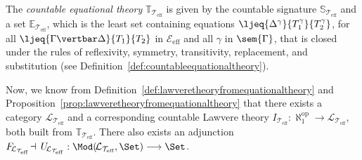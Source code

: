 \begin{definition}
\label{def:countableeqthfromeffth}
The \emph{countable equational theory} $\mathbb{T}_{\!\mathcal{T}_{\text{eff}}}$ is given by the countable signature $\mathbb{S}_{\mathcal{T}_{\text{eff}}}$ and a set $\mathbb{E}_{\!\mathcal{T}_{\text{eff}}}$, which is the least set containing equations $\ljeq {\Delta^\gamma} {T^\gamma_1} {T^\gamma_2}$, for all  $\ljeq {\Gamma \vertbar \Delta} {T_1} {T_2}$ in $\mathcal{E}_{\text{eff}}$ and all $\gamma$ in $\sem{\Gamma}$, that is closed under the rules of reflexivity, symmetry, transitivity, replacement, and substitution (see Definition~\ref{def:countableequationaltheory}).
\end{definition}

Now, we know from Definition~\ref{def:lawveretheoryfromequationaltheory} and Proposition~\ref{prop:lawveretheoryfromequationaltheory} that there exists a category $\mathcal{L}_{\mathcal{T}_{\text{eff}}}$ and a corresponding countable Lawvere theory $I_{\mathcal{T}_{\text{eff}}} : \aleph^{\text{op}}_{\!1} \longrightarrow \mathcal{L}_{\mathcal{T}_{\text{eff}}}$, both built from $\mathbb{T}_{\!\mathcal{T}_{\text{eff}}}$. There also exists an adjunction $F_{\!\mathcal{L}_{\mathcal{T}_{\text{eff}}}} \!\dashv\, U_{\!\mathcal{L}_{\mathcal{T}_{\text{eff}}}} : \Mod(\!\mathcal{L}_{\mathcal{T}_{\text{eff}}},\Set) \longrightarrow \Set$. 

